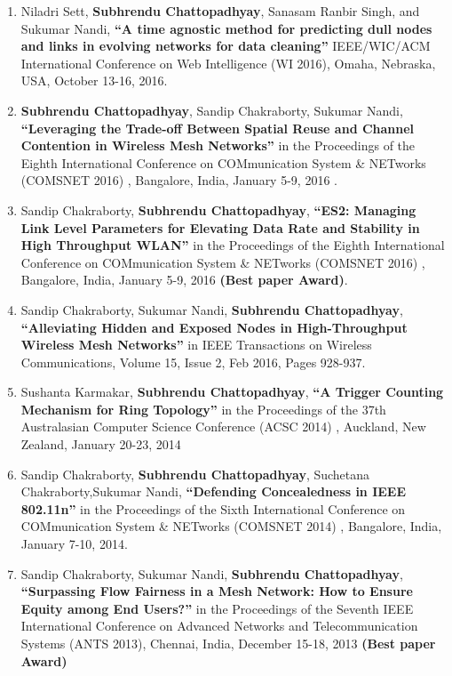\documentclass{res}
\newcommand{\papertitle}[1]{\textbf{ ``#1''}}
\begin{document}
\begin{resume}
\begin{enumerate}
		\item 	Niladri Sett, {\bf Subhrendu Chattopadhyay}, Sanasam Ranbir Singh, and Sukumar Nandi, \papertitle{A time agnostic method for predicting dull nodes and links in evolving networks for data cleaning} IEEE/WIC/ACM International Conference on Web Intelligence (WI 2016), Omaha, Nebraska, USA, October 13-16, 2016. 
		\item {\bf Subhrendu Chattopadhyay}, Sandip Chakraborty, Sukumar Nandi, \papertitle{Leveraging the Trade-off Between Spatial Reuse and Channel Contention in Wireless Mesh Networks} in the Proceedings of the Eighth International Conference on COMmunication System \& NETworks {(COMSNET 2016)} , Bangalore, India, January 5-9, 2016 .
		\item Sandip Chakraborty, {\bf Subhrendu Chattopadhyay}, \papertitle{ES2: Managing Link Level Parameters for Elevating Data Rate and Stability in High Throughput WLAN} in the Proceedings of the Eighth International Conference on COMmunication System \& NETworks {(COMSNET 2016)} , Bangalore, India, January 5-9, 2016 {\bf (Best paper Award)}.
		\item Sandip Chakraborty, Sukumar Nandi, {\bf Subhrendu Chattopadhyay}, \papertitle{Alleviating Hidden and Exposed Nodes in High-Throughput Wireless Mesh Networks} in IEEE Transactions on Wireless Communications, Volume 15, Issue 2, Feb 2016, Pages 928-937.
		\item Sushanta Karmakar, {\bf Subhrendu Chattopadhyay},  \papertitle{A Trigger Counting Mechanism for Ring Topology}  in the Proceedings of the 37th Australasian Computer Science Conference (ACSC 2014) , Auckland, New Zealand, January 20-23, 2014
		\item Sandip Chakraborty, {\bf Subhrendu Chattopadhyay}, Suchetana Chakraborty,Sukumar Nandi,  \papertitle{Defending Concealedness in IEEE 802.11n}  in the Proceedings of the Sixth International Conference on COMmunication System \& NETworks (COMSNET 2014) , Bangalore, India, January 7-10, 2014.
		\item Sandip Chakraborty, Sukumar Nandi, {\bf Subhrendu Chattopadhyay}, \papertitle{Surpassing Flow Fairness in a Mesh Network: How to Ensure Equity among End Users?}  in the Proceedings of the Seventh IEEE International Conference on Advanced Networks and Telecommunication Systems (ANTS 2013), Chennai, India, December 15-18, 2013 {\bf (Best paper Award)} 
	\end{enumerate}        
\end{resume}
\end{document}
